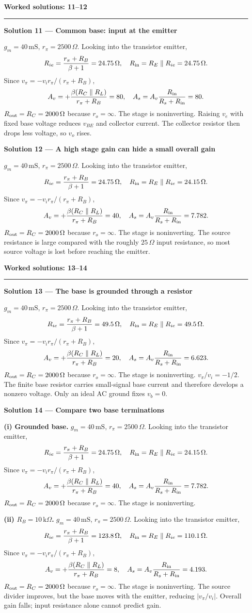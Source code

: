 \documentclass[11pt,a4paper]{article}
\newcommand{\K}{\,\mathrm{k}\Omega}\newcommand{\Oh}{\,\Omega}\newcommand{\mS}{\,\mathrm{mS}}
\newcommand{\head}[1]{\par{\Large\bfseries\color{ink}#1}\par\vspace{3pt}\hrule\vspace{7pt}}
\newcommand{\sol}[2]{\par{\large\bfseries\color{ink}Solution #1 --- #2}\label{sol:#1}\par}
\begin{document}
\newpage
\head{Worked solutions: 11--12}
\sol{11}{Common base: input at the emitter}$g_m=40\mS$, $r_\pi=2500\Oh$. Looking into the transistor emitter,
\[R_{ie}=\frac{r_\pi+R_B}{\beta+1}=24.75\Oh,\quad R_{\rm in}=R_E\parallel R_{ie}=24.75\Oh.\]
Since $v_\pi=-v_i r_\pi/(r_\pi+R_B)$,
\[A_v=+\frac{\beta(R_C\parallel R_L)}{r_\pi+R_B}=80,\quad A_s=A_v\frac{R_{\rm in}}{R_s+R_{\rm in}}=80.\]
$R_{\rm out}=R_C=2000\Oh$ because $r_o=\infty$. The stage is noninverting. Raising $v_e$ with fixed base voltage reduces $v_{BE}$ and collector current. The collector resistor then drops less voltage, so $v_o$ rises.\par\vfill
\sol{12}{A high stage gain can hide a small overall gain}$g_m=40\mS$, $r_\pi=2500\Oh$. Looking into the transistor emitter,
\[R_{ie}=\frac{r_\pi+R_B}{\beta+1}=24.75\Oh,\quad R_{\rm in}=R_E\parallel R_{ie}=24.15\Oh.\]
Since $v_\pi=-v_i r_\pi/(r_\pi+R_B)$,
\[A_v=+\frac{\beta(R_C\parallel R_L)}{r_\pi+R_B}=40,\quad A_s=A_v\frac{R_{\rm in}}{R_s+R_{\rm in}}=7.782.\]
$R_{\rm out}=R_C=2000\Oh$ because $r_o=\infty$. The stage is noninverting. The source resistance is large compared with the roughly $25\Oh$ input resistance, so most source voltage is lost before reaching the emitter.\par\vfill

\newpage
\head{Worked solutions: 13--14}
\sol{13}{The base is grounded through a resistor}$g_m=40\mS$, $r_\pi=2500\Oh$. Looking into the transistor emitter,
\[R_{ie}=\frac{r_\pi+R_B}{\beta+1}=49.5\Oh,\quad R_{\rm in}=R_E\parallel R_{ie}=49.5\Oh.\]
Since $v_\pi=-v_i r_\pi/(r_\pi+R_B)$,
\[A_v=+\frac{\beta(R_C\parallel R_L)}{r_\pi+R_B}=20,\quad A_s=A_v\frac{R_{\rm in}}{R_s+R_{\rm in}}=6.623.\]
$R_{\rm out}=R_C=2000\Oh$ because $r_o=\infty$. The stage is noninverting. $v_\pi/v_i=-1/2$. The finite base resistor carries small-signal base current and therefore develops a nonzero voltage. Only an ideal AC ground fixes $v_b=0$.\par\vfill
\sol{14}{Compare two base terminations}\textbf{(i) Grounded base.} $g_m=40\mS$, $r_\pi=2500\Oh$. Looking into the transistor emitter,
\[R_{ie}=\frac{r_\pi+R_B}{\beta+1}=24.75\Oh,\quad R_{\rm in}=R_E\parallel R_{ie}=24.15\Oh.\]
Since $v_\pi=-v_i r_\pi/(r_\pi+R_B)$,
\[A_v=+\frac{\beta(R_C\parallel R_L)}{r_\pi+R_B}=40,\quad A_s=A_v\frac{R_{\rm in}}{R_s+R_{\rm in}}=7.782.\]
$R_{\rm out}=R_C=2000\Oh$ because $r_o=\infty$. The stage is noninverting.\par\textbf{(ii) $R_B=10\K$.} $g_m=40\mS$, $r_\pi=2500\Oh$. Looking into the transistor emitter,
\[R_{ie}=\frac{r_\pi+R_B}{\beta+1}=123.8\Oh,\quad R_{\rm in}=R_E\parallel R_{ie}=110.1\Oh.\]
Since $v_\pi=-v_i r_\pi/(r_\pi+R_B)$,
\[A_v=+\frac{\beta(R_C\parallel R_L)}{r_\pi+R_B}=8,\quad A_s=A_v\frac{R_{\rm in}}{R_s+R_{\rm in}}=4.193.\]
$R_{\rm out}=R_C=2000\Oh$ because $r_o=\infty$. The stage is noninverting. The source divider improves, but the base moves with the emitter, reducing $|v_\pi/v_i|$. Overall gain falls; input resistance alone cannot predict gain.\par\vfill
\end{document}
